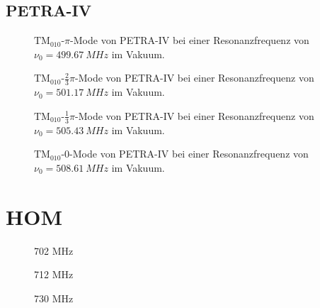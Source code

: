 \subsection{PETRA-IV}
\FloatBarrier
\begin{figure}[h]
  \centering
  
  \caption{$\mathrm{TM}_{010}\text{-}\pi$-Mode von PETRA-IV bei einer Resonanzfrequenz von $\nu_0 = \SI{499.67}{MHz}$ im Vakuum.}
\end{figure}

\begin{figure}[h]
  \centering
  
  \caption{$\mathrm{TM}_{010}\text{-}\frac{2}{3}\pi$-Mode von PETRA-IV bei einer Resonanzfrequenz von $\nu_0 = \SI{501.17}{MHz}$ im Vakuum.}
\end{figure}

\begin{figure}[h]
  \centering
  
  \caption{$\mathrm{TM}_{010}\text{-}\frac{1}{3}\pi$-Mode von PETRA-IV bei einer Resonanzfrequenz von $\nu_0 = \SI{505.43}{MHz}$ im Vakuum.}
\end{figure}

\begin{figure}[h]
  \centering
  
  \caption{$\mathrm{TM}_{010}\text{-}0$-Mode von PETRA-IV bei einer Resonanzfrequenz von $\nu_0 = \SI{508.61}{MHz}$ im Vakuum.}
\end{figure}
\FloatBarrier

\section{HOM}
\label{app:hom_felder}
\FloatBarrier

\begin{figure}[h]
  \centering
  
  \caption{702 MHz}
\end{figure}

\begin{figure}[h]
  \centering
  
  \caption{712 MHz}
\end{figure}

\begin{figure}[h]
  \centering
  
  \caption{730 MHz}
\end{figure}

